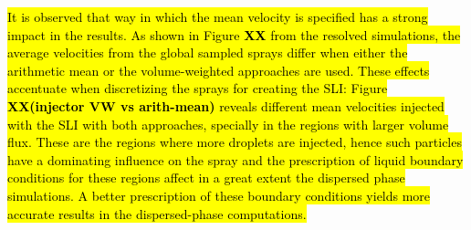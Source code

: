 \hl{It is observed that way in which the mean velocity is specified has a strong impact in the results. As shown in Figure \textbf{XX} from the resolved simulations, the average velocities from the global sampled sprays differ when either the arithmetic mean or the volume-weighted approaches are used. These effects accentuate when discretizing the sprays for creating the SLI: Figure \textbf{XX(injector VW vs arith-mean)} reveals different mean velocities injected with the SLI with both approaches, specially in the regions with larger volume flux. These are the regions where more droplets are injected, hence such particles have a dominating influence on the spray and the prescription of liquid boundary conditions for these regions affect in a great extent the dispersed phase simulations. A better prescription of these boundary conditions yields more accurate results in the dispersed-phase computations.}


